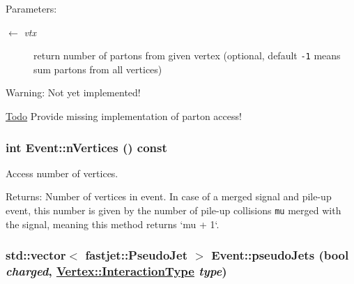 \begin{Desc}
\item[Parameters:]
\begin{description}
\item[\mbox{$\leftarrow$} {\em vtx}]return number of partons from given vertex (optional, default {\tt -1} means sum partons from all vertices)\end{description}
\end{Desc}
\begin{Desc}
\item[Warning:]Not yet implemented! \end{Desc}
\begin{Desc}
\item[\hyperlink{todo__todo000003}{Todo}]Provide missing implementation of parton access! \end{Desc}
\hypertarget{classEvent_c2f3b1843699e28c867a616194130dda}{
\subsubsection[nVertices]{\setlength{\rightskip}{0pt plus 5cm}int Event::n\-Vertices () const}}
\label{classEvent_c2f3b1843699e28c867a616194130dda}


Access number of vertices. 

\begin{Desc}
\item[Returns:]Number of vertices in event. In case of a merged signal and pile-up event, this number is given by the number of pile-up collisions {\tt mu} merged with the signal, meaning this method returns `mu + 1`. \end{Desc}
\hypertarget{classEvent_2b3dad2b39e8832a106796f6f9e35a3b}{
\subsubsection[pseudoJets]{\setlength{\rightskip}{0pt plus 5cm}std::vector$<$ fastjet::Pseudo\-Jet $>$ Event::pseudo\-Jets (bool {\em charged}, \hyperlink{classVertex_0d80a5c5ed3bd9be72a325aa448eca25}{Vertex::Interaction\-Type} {\em type})}}
\label{classEvent_2b3dad2b39e8832a106796f6f9e35a3b}


